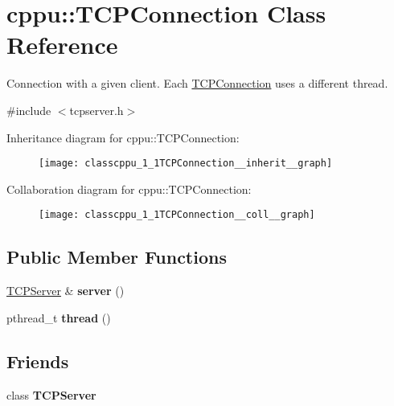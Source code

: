 \hypertarget{classcppu_1_1TCPConnection}{}\section{cppu\+:\+:T\+C\+P\+Connection Class Reference}
\label{classcppu_1_1TCPConnection}


Connection with a given client. Each \hyperlink{classcppu_1_1TCPConnection}{T\+C\+P\+Connection} uses a different thread.  




{\ttfamily \#include $<$tcpserver.\+h$>$}



Inheritance diagram for cppu\+:\+:T\+C\+P\+Connection\+:\nopagebreak
\begin{figure}[H]
\begin{center}
\leavevmode
\texttt{[image: classcppu\_1\_1TCPConnection\_\_inherit\_\_graph]}
\end{center}
\end{figure}


Collaboration diagram for cppu\+:\+:T\+C\+P\+Connection\+:\nopagebreak
\begin{figure}[H]
\begin{center}
\leavevmode
\texttt{[image: classcppu\_1\_1TCPConnection\_\_coll\_\_graph]}
\end{center}
\end{figure}
\subsection*{Public Member Functions}
\begin{DoxyCompactItemize}
\item 
\hyperlink{classcppu_1_1TCPServer}{T\+C\+P\+Server} \& {\bfseries server} ()\hypertarget{classcppu_1_1TCPConnection_a4186946c7c22e3c2cebe3a97aa78f5f7}{}\label{classcppu_1_1TCPConnection_a4186946c7c22e3c2cebe3a97aa78f5f7}

\item 
pthread\+\_\+t {\bfseries thread} ()\hypertarget{classcppu_1_1TCPConnection_a4663875b80fced790502880c72e6e672}{}\label{classcppu_1_1TCPConnection_a4663875b80fced790502880c72e6e672}

\end{DoxyCompactItemize}
\subsection*{Friends}
\begin{DoxyCompactItemize}
\item 
class {\bfseries T\+C\+P\+Server}\hypertarget{classcppu_1_1TCPConnection_ae4cfdb1814d91a8d28dadb49adda68f0}{}\label{classcppu_1_1TCPConnection_ae4cfdb1814d91a8d28dadb49adda68f0}

\end{DoxyCompactItemize}
